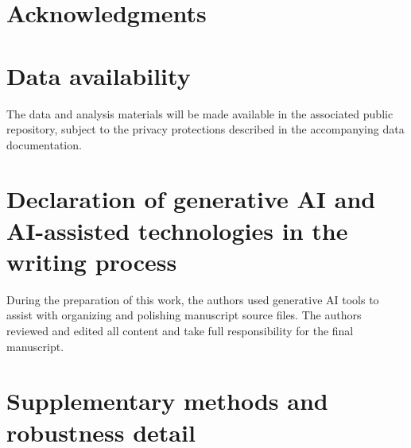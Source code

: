 \documentclass[final,5p,times,twocolumn]{elsarticle}
\begin{document}
\section*{Acknowledgments}

\section*{Data availability}
The data and analysis materials will be made available in the associated public repository, subject to the privacy protections described in the accompanying data documentation.

\section*{Declaration of generative AI and AI-assisted technologies in the writing process}
During the preparation of this work, the authors used generative AI tools to assist with organizing and polishing manuscript source files. The authors reviewed and edited all content and take full responsibility for the final manuscript.

\appendix
\section{Supplementary methods and robustness detail}\label{app:methods}



\end{document}
